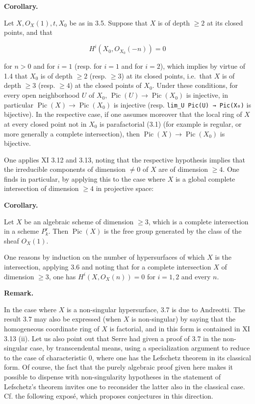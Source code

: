\documentclass[
]{article}
\begin{document}
\textbf{Corollary.}

Let \(X, O_{X}(1), t, X_{0}\) be as in 3.5. Suppose that \(X\) is of
depth \(\geqslant 2\) at its closed points, and that

\[
H^{i}(X_{0}, O_{X_{0}}(-n)) = 0
\]

for \(n > 0\) and for \(i = 1\) (resp. for \(i = 1\) and for \(i = 2\)),
which implies by virtue of 1.4 that \(X_{0}\) is of depth
\(\geqslant 2\) (resp. \(\geqslant 3\)) at its closed points, i.e.~that
\(X\) is of depth \(\geqslant 3\) (resp. \(\geqslant 4\)) at the closed
points of \(X_{0}\). Under these conditions, for every open neighborhood
\(U\) of \(X_{0}\),
\(\operatorname{Pic}(U) \to \operatorname{Pic}(X_{0})\) is injective, in
particular \(\operatorname{Pic}(X) \to \operatorname{Pic}(X_{0})\) is
injective (resp. \texttt{lim\_U\ Pic(U)\ →\ Pic(X₀)} is bijective). In
the respective case, if one assumes moreover that the local ring of
\(X\) at every closed point not in \(X_{0}\) is parafactorial (3.1) (for
example is regular, or more generally a complete intersection), then
\(\operatorname{Pic}(X) \to \operatorname{Pic}(X_{0})\) is bijective.

One applies XI 3.12 and 3.13, noting that the respective hypothesis
implies that the irreducible components of dimension \(\neq 0\) of \(X\)
are of dimension \(\geqslant 4\). One finds in particular, by applying
this to the case where \(X\) is a global complete intersection of
dimension \(\geqslant 4\) in projective space:

\textbf{Corollary.}

Let \(X\) be an algebraic scheme of dimension \(\geqslant 3\), which is
a complete intersection in a scheme \(P^{r}_{k}\). Then
\(\operatorname{Pic}(X)\) is the free group generated by the class of
the sheaf \(O_{X}(1)\).

One reasons by induction on the number of hypersurfaces of which \(X\)
is the intersection, applying 3.6 and noting that for a complete
intersection \(X\) of dimension \(\geqslant 3\), one has
\(H^{i}(X, O_{X}(n)) = 0\) for \(i = 1, 2\) and every \(n\).

\textbf{Remark.}

In the case where \(X\) is a non-singular hypersurface, 3.7 is due to
Andreotti. The result 3.7 may also be expressed (when \(X\) is
non-singular) by saying that the homogeneous coordinate ring of \(X\) is
factorial, and in this form is contained in XI 3.13 (ii). Let us also
point out that Serre had given a proof of 3.7 in the non-singular case,
by transcendental means, using a specialization argument to reduce to
the case of characteristic 0, where one has the Lefschetz theorem in its
classical form. Of course, the fact that the purely algebraic proof
given here makes it possible to dispense with non-singularity hypotheses
in the statement of Lefschetz's theorem invites one to reconsider the
latter also in the classical case. Cf. the following exposé, which
proposes conjectures in this direction.
\end{document}
